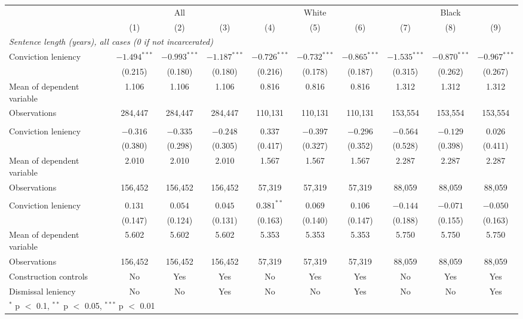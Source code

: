 \begin{tabular}{lccccccccc}
\toprule
 & \multicolumn{3}{c}{All} & \multicolumn{3}{c}{White} & \multicolumn{3}{c}{Black} \\
\cmidrule(lr){2-4}\cmidrule(lr){5-7}\cmidrule(lr){8-10}
 & (1) & (2) & (3) & (4) & (5) & (6) & (7) & (8) & (9) \\
\midrule
\multicolumn{10}{l}{\textit{Sentence length (years), all cases (0 if not incarcerated)}} \\
\quad Conviction leniency & $-1.494^{***}$ & $-0.993^{***}$ & $-1.187^{***}$ & $-0.726^{***}$ & $-0.732^{***}$ & $-0.865^{***}$ & $-1.535^{***}$ & $-0.870^{***}$ & $-0.967^{***}$ \\
 & (0.215) & (0.180) & (0.180) & (0.216) & (0.178) & (0.187) & (0.315) & (0.262) & (0.267) \\
\quad Mean of dependent variable & 1.106 & 1.106 & 1.106 & 0.816 & 0.816 & 0.816 & 1.312 & 1.312 & 1.312 \\
\quad Observations & 284,447 & 284,447 & 284,447 & 110,131 & 110,131 & 110,131 & 153,554 & 153,554 & 153,554 \\
\addlinespace
\multicolumn{10}{l}{\textit{Sentence length (years), incarcerated}} \\
\quad Conviction leniency & $-0.316$ & $-0.335$ & $-0.248$ & $0.337$ & $-0.397$ & $-0.296$ & $-0.564$ & $-0.129$ & $0.026$ \\
 & (0.380) & (0.298) & (0.305) & (0.417) & (0.327) & (0.352) & (0.528) & (0.398) & (0.411) \\
\quad Mean of dependent variable & 2.010 & 2.010 & 2.010 & 1.567 & 1.567 & 1.567 & 2.287 & 2.287 & 2.287 \\
\quad Observations & 156,452 & 156,452 & 156,452 & 57,319 & 57,319 & 57,319 & 88,059 & 88,059 & 88,059 \\
\addlinespace
\multicolumn{10}{l}{\textit{Log sentence length (days), incarcerated}} \\
\quad Conviction leniency & $0.131$ & $0.054$ & $0.045$ & $0.381^{**}$ & $0.069$ & $0.106$ & $-0.144$ & $-0.071$ & $-0.050$ \\
 & (0.147) & (0.124) & (0.131) & (0.163) & (0.140) & (0.147) & (0.188) & (0.155) & (0.163) \\
\quad Mean of dependent variable & 5.602 & 5.602 & 5.602 & 5.353 & 5.353 & 5.353 & 5.750 & 5.750 & 5.750 \\
\quad Observations & 156,452 & 156,452 & 156,452 & 57,319 & 57,319 & 57,319 & 88,059 & 88,059 & 88,059 \\
\midrule
Construction controls & No & Yes & Yes & No & Yes & Yes & No & Yes & Yes \\
Dismissal leniency & No & No & Yes & No & No & Yes & No & No & Yes \\
\bottomrule
\multicolumn{10}{l}{\footnotesize $^{*}$ p $<$ 0.1, $^{**}$ p $<$ 0.05, $^{***}$ p $<$ 0.01} \\
\end{tabular}
